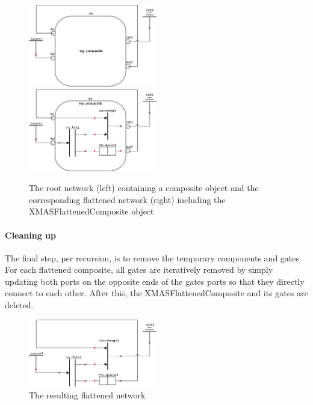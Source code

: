 \begin{figure}[ht]
    \includegraphics[width=0.5\textwidth]{example-hier-network}
    \hfill
    \includegraphics[width=0.5\textwidth]{example-hier-network-inserted}
    \caption{The root network (left) containing a composite object and the
    corresponding flattened network (right) including the XMASFlattenedComposite object}
    \label{fig:flattened-composite}
\end{figure}

\paragraph{Cleaning up}
The final step, per recursion, is to remove the temporary components and gates.
For each flattened composite, all gates are iteratively removed by simply
updating both ports on the opposite ends of the gates ports so that they
directly connect to each other. After this, the XMASFlattenedComposite and its
gates are deleted.


\begin{figure}[ht]
    \centering
    \includegraphics[width=0.5\textwidth]{example-hier-network-final}
    \caption{The resulting flattened network}
    \label{fig:final-network}
\end{figure}




